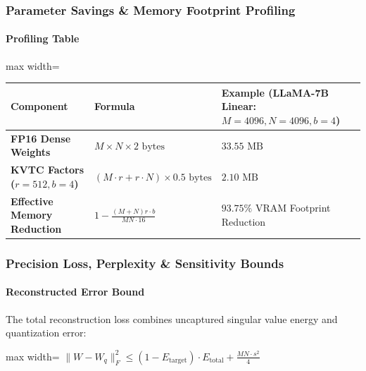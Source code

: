 \subsubsection*{Parameter Savings \& Memory Footprint Profiling}

\paragraph{Profiling Table}

\begin{center}
\begin{adjustbox}{max width=\columnwidth}
\renewcommand{\arraystretch}{1.2}
\begin{tabular}{lll}
\toprule
Component & Formula & Example (LLaMA-7B Linear: $M=4096, N=4096, b=4$) \\
\midrule
\textbf{FP16 Dense Weights} & $M \times N \times 2 \text{ bytes}$ & $33.55 \text{ MB}$ \\
\textbf{KVTC Factors ($r=512, b=4$)} & $(M \cdot r + r \cdot N) \times 0.5 \text{ bytes}$ & $2.10 \text{ MB}$ \\
\textbf{Effective Memory Reduction} & $1 - \frac{(M+N) r \cdot b}{M N \cdot 16}$ & $\mathbf{93.75\%}$ VRAM Footprint Reduction \\

\bottomrule
\end{tabular}
\end{adjustbox}
\end{center}

\subsubsection*{Precision Loss, Perplexity \& Sensitivity Bounds}

\paragraph{Reconstructed Error Bound}

The total reconstruction loss combines uncaptured singular value energy and quantization error:

\begin{center}
\begin{adjustbox}{max width=\columnwidth}
$\displaystyle
\| W - W_q \|_F^2 \le (1 - E_{\text{target}}) \cdot E_{\text{total}} + \frac{M N \cdot s^2}{4}
$
\end{adjustbox}
\end{center}

